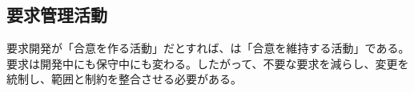\subsection{要求管理活動}

要求開発が「合意を作る活動」だとすれば、は「合意を維持する活動」である。要求は開発中にも保守中にも変わる。したがって、不要な要求を減らし、変更を統制し、範囲と制約を整合させる必要がある。
